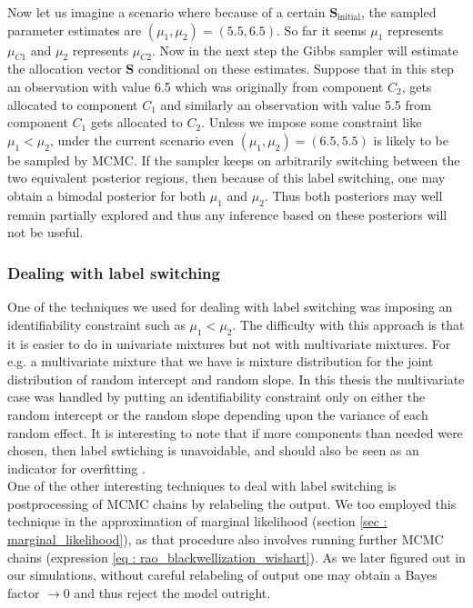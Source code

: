 Now let us imagine a scenario where because of a certain $\boldsymbol{S}_\text{initial}$, the sampled parameter estimates are $(\mu_1, \mu_2) = (5.5,6.5)$. So far it seems $\mu_1$ represents $\mu_{C1}$ and $\mu_2$ represents $\mu_{C2}$. Now in the next step the Gibbs sampler will estimate the allocation vector $\boldsymbol{S}$ conditional on these estimates. Suppose that in this step an observation with value 6.5 which was originally from component $C_2$, gets allocated to component $C_1$ and similarly an observation with value 5.5 from component $C_1$ gets allocated to $C_2$. Unless we impose some constraint like $\mu_1 < \mu_2$, under the current scenario even $(\mu_1,\mu_2) = (6.5, 5.5)$ is likely to be be sampled by MCMC. If the sampler keeps on arbitrarily switching between the two equivalent posterior regions, then because of this label switching, one may obtain a bimodal posterior for both $\mu_1$ and $\mu_2$. Thus both posteriors may well remain partially explored and thus any inference based on these posteriors will not be useful.

\subsubsection{Dealing with label switching}
One of the techniques we used for dealing with label switching was imposing an identifiability constraint such as $\mu_1 < \mu_2$. The difficulty with this approach is that it is easier to do in univariate mixtures but not with multivariate mixtures. For e.g. a multivariate mixture that we have is mixture distribution for the joint distribution of random intercept and random slope. In this thesis the multivariate case was handled by putting an identifiability constraint only on either the random intercept or the random slope depending upon the variance of each random effect. It is interesting to note that if more components than needed were chosen, then label swtiching is unavoidable, and should also be seen as an indicator for overfitting \citep[pg. 104]{fruhwirth-schnatter_finite_2013}.\\

One of the other interesting techniques to deal with label switching is postprocessing of MCMC chains by relabeling the output\citep{richardson_bayesian_1997,stephens_dealing_2000}. We too employed this technique in the approximation of marginal likelihood (section \ref{sec : marginal_likelihood}), as that procedure also involves running further MCMC chains (expression \ref{eq : rao_blackwellization_wishart}). As we later figured out in our simulations, without careful relabeling of output one may obtain a Bayes factor $\to 0$ and thus reject the model outright.